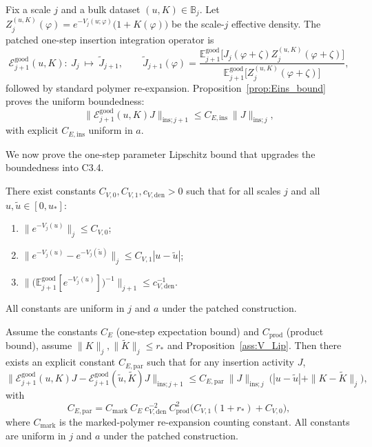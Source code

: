 Fix a scale $j$ and a bulk dataset $(u,K)\in\mathbb B_j$.
Let $Z_j^{(u,K)}(\varphi)=e^{-V_j(u;\varphi)}\big(1+K(\varphi)\big)$ be the scale-$j$ effective density.
The patched one-step insertion integration operator is
\[
\mathcal E^{\mathrm{good}}_{j+1}(u,K):\ J_j\ \mapsto\ \widetilde J_{j+1},
\qquad
\widetilde J_{j+1}(\varphi)
=
\frac{\mathbb E_{j+1}^{\mathrm{good}}\!\big[J_j(\varphi+\zeta)Z_j^{(u,K)}(\varphi+\zeta)\big]}
{\mathbb E_{j+1}^{\mathrm{good}}\!\big[Z_j^{(u,K)}(\varphi+\zeta)\big]},
\]
followed by standard polymer re-expansion.
Proposition~\ref{prop:Eins_bound} proves the uniform boundedness:
\begin{equation}\label{eq:Eins_bound}
\|\mathcal E^{\mathrm{good}}_{j+1}(u,K)J\|_{\mathrm{ins};j+1}\le C_{E,\mathrm{ins}}\ \|J\|_{\mathrm{ins};j},
\end{equation}
with explicit $C_{E,\mathrm{ins}}$ uniform in $a$.

We now prove the one-step parameter Lipschitz bound that upgrades the boundedness into C3.4.

\begin{proposition}\label{ass:V_Lip}
There exist constants $C_{V,0},C_{V,1},c_{V,\mathrm{den}}>0$ such that for all scales $j$ and all $u,\widetilde u\in[0,u_\ast]$:
\begin{enumerate}[label=(V\arabic*)]
\item $\|e^{-V_j(u)}\|_j\le C_{V,0}$;
\item $\|e^{-V_j(u)}-e^{-V_j(\widetilde u)}\|_j\le C_{V,1}|u-\widetilde u|$;
\item $\|\big(\mathbb E_{j+1}^{\mathrm{good}}[e^{-V_j(u)}]\big)^{-1}\|_{j+1}\le c_{V,\mathrm{den}}^{-1}$.
\end{enumerate}
All constants are uniform in $j$ and $a$ under the patched construction.
\end{proposition}

\begin{lemma}\label{lem:Eins_paramLip}
Assume the constants $C_E$ (one-step expectation bound) and $C_{\mathrm{prod}}$ (product bound),
assume $\|K\|_j,\|\widetilde K\|_j\le r_\ast$ and Proposition~\ref{ass:V_Lip}.
Then there exists an explicit constant $C_{E,\mathrm{par}}$ such that for any insertion activity $J$,
\begin{equation}\label{eq:Eins_paramLip}
\|\mathcal E^{\mathrm{good}}_{j+1}(u,K)J-\mathcal E^{\mathrm{good}}_{j+1}(\widetilde u,\widetilde K)J\|_{\mathrm{ins};j+1}
\le
C_{E,\mathrm{par}}\ \|J\|_{\mathrm{ins};j}\ \Big(|u-\widetilde u|+\|K-\widetilde K\|_j\Big),
\end{equation}
with
\begin{equation}\label{eq:C_Epar}
C_{E,\mathrm{par}}
=
C_{\mathrm{mark}}\ C_E\ c_{V,\mathrm{den}}^{-2}\ C_{\mathrm{prod}}^2\Big(
C_{V,1}(1+r_\ast)+C_{V,0}\Big),
\end{equation}
where $C_{\mathrm{mark}}$ is the marked-polymer re-expansion counting constant.
All constants are uniform in $j$ and $a$ under the patched construction.
\end{lemma}

